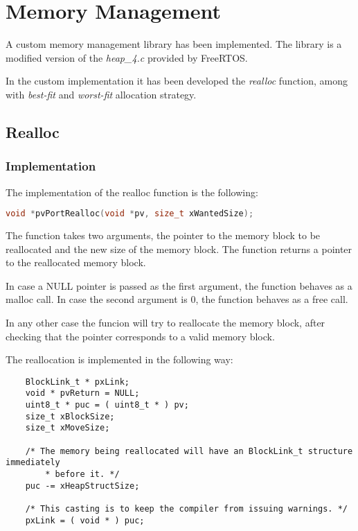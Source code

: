 \section{Memory Management}

A custom memory management library has been implemented. The library is a modified version of the \textit{heap\_4.c} provided by FreeRTOS.

In the custom implementation it has been developed the \textit{realloc} function, among with \textit{best-fit} and \textit{worst-fit} allocation strategy.

\subsection{Realloc}
    \subsubsection{Implementation}
    The implementation of the realloc function is the following:

    \begin{lstlisting}[language=c]
    void *pvPortRealloc(void *pv, size_t xWantedSize);
    \end{lstlisting}

    The function takes two arguments, the pointer to the memory block to be reallocated and the new size of the memory block. The function returns a pointer to the reallocated memory block.

    In case a NULL pointer is passed as the first argument, the function behaves as a malloc call. In case the second argument is 0, the function behaves as a free call.
    
    In any other case the funcion will try to reallocate the memory block, after checking that the pointer corresponds to a valid memory block.

    The reallocation is implemented in the following way:

    \begin{codebox}
    \begin{lstlisting}
    BlockLink_t * pxLink;
    void * pvReturn = NULL;
    uint8_t * puc = ( uint8_t * ) pv;
    size_t xBlockSize;
    size_t xMoveSize;

    /* The memory being reallocated will have an BlockLink_t structure immediately
        * before it. */
    puc -= xHeapStructSize;

    /* This casting is to keep the compiler from issuing warnings. */
    pxLink = ( void * ) puc;
    \end{lstlisting}
    \end{codebox}

